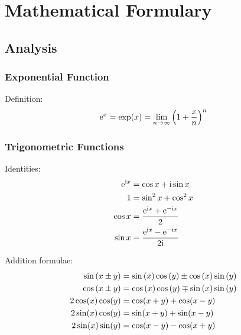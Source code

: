 \section{Mathematical Formulary}
	\subsection{Analysis}
		\subsubsection{Exponential Function}
			\noindent
			Definition:
			\begin{equation}
				\mathrm{e}^x=\exp(x)=\lim_{n \to \infty}\qty(1+\frac{x}{n})^n
			\end{equation}

		\subsubsection{Trigonometric Functions}
			\noindent
			Identities:
			\begin{equation}
				\begin{split}
					\mathrm{e}^{\mathrm{i} x}&=\cos x+\mathrm{i}\sin x \\
					1&=\sin^{2}x+\cos^{2}x \\
					\cos{x}&=\frac{\mathrm{e}^{\mathrm{i} x}+\mathrm{e}^{-\mathrm{i} x}}{2} \\
					\sin{ x}&=\frac{\mathrm{e}^{\mathrm{i} x}-\mathrm{e}^{-\mathrm{i} x}}{2\mathrm{i}} \\
				\end{split}
			\end{equation}

			\noindent
			Addition formulae:
			\begin{equation}
				\begin{split}
					\sin\qty( x\pm y)&=\sin\qty(x)\cos\qty(y)\pm\cos\qty(x) \sin\qty(y) \\
					\cos\qty( x\pm y)&=\cos\qty(x)\cos\qty(y)\mp\sin\qty(x) \sin\qty(y) \\
					2 \cos(x) \cos(y) &= \cos(x + y) + \cos(x - y) \\
					2 \sin(x) \cos(y) &= \sin(x + y) + \sin(x - y) \\
					2 \sin(x) \sin(y) &= \cos(x - y) - \cos(x + y) \\
				\end{split}
			\end{equation}

